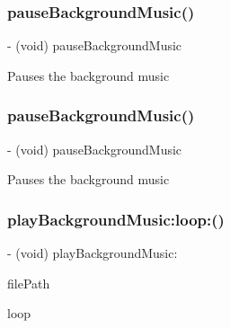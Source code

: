\subsubsection{\texorpdfstring{pause\+Background\+Music()}{pauseBackgroundMusic()}\hspace{0.1cm}{\footnotesize\ttfamily [3/4]}}
{\footnotesize\ttfamily -\/ (void) pause\+Background\+Music \begin{DoxyParamCaption}{ }\end{DoxyParamCaption}}

Pauses the background music \mbox{\label{interfaceCDAudioManager_acbd505494ec2f01e484dfca635b208b8}} 
\subsubsection{\texorpdfstring{pause\+Background\+Music()}{pauseBackgroundMusic()}\hspace{0.1cm}{\footnotesize\ttfamily [4/4]}}
{\footnotesize\ttfamily -\/ (void) pause\+Background\+Music \begin{DoxyParamCaption}{ }\end{DoxyParamCaption}}

Pauses the background music \mbox{\label{interfaceCDAudioManager_a940bfd555f763ee56217b6d589cb6a30}} 
\subsubsection{\texorpdfstring{play\+Background\+Music\+:loop\+:()}{playBackgroundMusic:loop:()}\hspace{0.1cm}{\footnotesize\ttfamily [1/4]}}
{\footnotesize\ttfamily -\/ (void) play\+Background\+Music\+: \begin{DoxyParamCaption}\item[{(N\+S\+String $\ast$)}]{file\+Path }\item[{loop:(B\+O\+OL)}]{loop }\end{DoxyParamCaption}}

